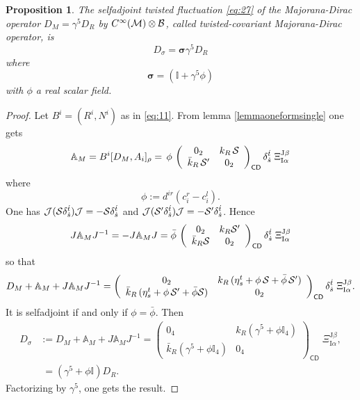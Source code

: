 \documentclass[11pt]{article}
\newcommand{\cinf}{{C^\infty({\cal M})}}
\newcommand{\sI}{\mathrm  I}
\newcommand{\sJ}{\mathrm J}
\newcommand{\sC}{\mathsf C}
\newcommand{\sD}{\mathsf D}
\newtheorem{prop}{Proposition}[section]
\begin{document}
\begin{prop}
\label{propsigma} The selfadjoint twisted fluctuation \eqref{eq:27} of the Majorana-Dirac operator
$D_M = \gamma^5D_R$ by $\cinf\otimes\cal B$, called twisted-covariant
Majorana-Dirac operator,  is 
\begin{equation}
  \label{eq:14}
  D_\sigma = {\boldsymbol \sigma}\gamma^5 D_R
\end{equation}
where
\begin{equation}
{\boldsymbol \sigma} = (\mathbb I +
\gamma^5\phi)
\label{eq:17}
\end{equation}
 with $\phi$ a real scalar field.
\end{prop}
\begin{proof}
Let $B^i=(R^i, N^i)$ as in \eqref{eq:11}.  From lemma \ref{lemmaoneformsingle} one gets
  \begin{equation}
    \label{eq:106}
  {\mathbb A}_M=  B^i [ D_M, A_i]_\rho = \, \phi\, \left(\begin{array}{cc}
      0_{2} & k_R\, {\cal S}\\ 
        \bar k_R \, {\cal S}' & 0_{2}\end{array}\right)_{\sC\sD} \delta_{\dot s}^{\dot t}\;\Xi_{\sI\alpha}^{\sJ\beta}
\end{equation}
where
\begin{equation}
  \label{eq:13}
  \phi := d^{ir}(c^r_i-c^l_i). 
\end{equation}
One has ${\cal  J}({\cal S}\delta_{\dot s}^{\dot t}){\cal  J}=
    -{\cal S}\delta_{\dot s}^{\dot t}$ and ${\cal  J}({\cal S'}\delta_{\dot s}^{\dot t}){\cal  J}= -{\cal S}'\delta_{\dot s}^{\dot t}$.
Hence
\begin{equation}
  \label{eq:108}
  J \mathbb A_M  J^{-1} =-  J \mathbb A_M  J =
  \bar \phi\,\left(\begin{array}{cc} 0_{2} & k_R {\cal S}'\\ \bar k_R {\cal S} & 0_{2}\end{array}\right)_{\sC\sD}\delta_{\dot s}^{\dot t}\;\Xi_{\sI\alpha}^{\sJ\beta}
\end{equation}
so that
\begin{equation}
  \label{eq:109}
 D_M +  \mathbb A_M + J \mathbb A_M J^{-1} =
  \left(\begin{array}{cc} 0_{2} & k_R\,(\eta_s^t +\phi\,{\cal S} + \bar\phi\,{\cal S}')\\
      \bar k_R\,(\eta_s^t +\phi\,{\cal S}' +\bar\phi {\cal S})&0_2\end{array}\right)_{\sC\sD}\delta_{\dot s}^{\dot t}\;\Xi_{\sI\alpha}^{\sJ\beta}.
\end{equation}
 It is selfadjoint if and only if $\phi=\bar \phi$.
Then 
\begin{align}
  \label{eq:4}
  D_\sigma &:=  D_M +  \mathbb A_M + J \mathbb A_M J^{-1}
  =\left(\begin{array}{cc}
0_4 & k_R(\gamma^5 + \phi \mathbb{I}_4)\\
\bar k_R(\gamma^5 + \phi \mathbb{I}_4)&
0_4\end{array}\right)_{\sC\sD}\;\Xi_{\sI\alpha}^{\sJ\beta},\\
& \; = (\gamma^5 + \phi \mathbb{I}) D_R.
\end{align}
Factorizing by $\gamma^5$, one gets the result.
\end{proof}
\end{document}
